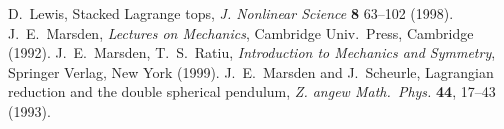 \documentclass[11pt]{amsart}
\begin{document}
\begin{thebibliography}{99}
 D.~Lewis,
   Stacked Lagrange tops,
   \emph{J. Nonlinear Science} \textbf{8} 63--102 (1998).
 J.~E.~Marsden, \emph{Lectures on Mechanics},
   Cambridge Univ.~Press, Cambridge (1992).
 J.~E.~Marsden, T.~S.~Ratiu,
   \emph{Introduction to Mechanics and Symmetry},
   Springer Verlag, New York (1999).
 J.~E.~Marsden and J.~Scheurle,
   Lagrangian reduction and the double spherical pendulum,
   \emph{Z. angew Math.~Phys.} \textbf{44}, 17--43 (1993).
\end{thebibliography}
\end{document}
